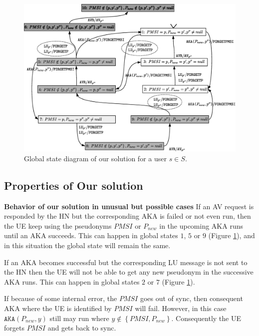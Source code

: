 \documentclass{llncs} %
\begin{document}
\begin{figure}[!tbp]
  \centering
    \includegraphics[scale = .35,clip = true,trim = 0cm 0cm 0cm 0cm]{solution_diagram.eps}
 \caption{Global state diagram of our solution for a user $s \in S$.}
  \label{fig:solution_diagram}
\end{figure}


\subsection{Properties of Our solution}



\textbf{Behavior of our solution in unusual but possible cases}
If an AV request is responded by the HN but the corresponding AKA is failed or not even run, then the UE keep using the pseudonyms $PMSI$ or $P_{new}$ in the upcoming AKA runs until an AKA succeeds. This can happen in global states $1$, $5$ or $9$ (Figure \ref{fig:solution_diagram}), and in this situation the global state will remain the same.

If an AKA becomes successful but the corresponding LU message is not sent to the HN then the UE will not be able to get any new pseudonym in the successive AKA runs. This can happen in global states $2$ or $7$ (Figure \ref{fig:solution_diagram}).

If because of some internal error, the $PMSI$ goes out of sync, then consequent AKA where the UE is identified by $PMSI$ will fail. However, in this case $\texttt{AKA}(P_{new},y)$ still may run where $y \notin \left\lbrace PMSI,P_{new} \right\rbrace$. Consequently the UE forgets $PMSI$ and gets back to sync. 
\end{document}
